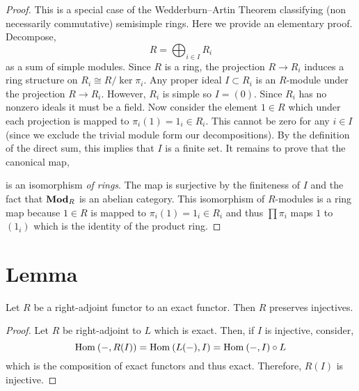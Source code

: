 \documentclass[12pt]{article}
\begin{document}
\begin{proof}
This is a special case of the Wedderburn–Artin Theorem classifying (non necessarily commutative) semisimple rings. Here we provide an elementary proof. Decompose,
\[ R = \bigoplus_{i \in I} R_i \]
as a sum of simple modules. Since $R$ is a ring, the projection $R \to R_i$ induces a ring structure on $R_i \cong R / \ker{\pi_i}$. Any proper ideal $I \subset R_i$ is an $R$-module under the projection $R \to R_i$. However, $R_i$ is simple so $I = (0)$. Since $R_i$ has no nonzero ideals it must be a field. Now consider the element $1 \in R$ which under each projection is mapped to $\pi_i(1) = 1_i \in R_i$. This cannot be zero for any $i \in I$ (since we exclude the trivial module form our decompositions). By the definition of the direct sum, this implies that $I$ is a finite set. It remains to prove that the canonical map,
\begin{center}
\end{center} 
is an isomorphism \textit{of rings}. The map is surjective by the finiteness of $I$ and the fact that $\mathbf{Mod}_{R}$ is an abelian category. This isomorphism of $R$-modules is a ring map because $1 \in R$ is mapped to $\pi_i(1) = 1_i \in R_i$ and thus $\prod \pi_i$ maps $1$ to $(1_i)$ which is the identity of the product ring.  
\end{proof}

\section{Lemma}

\begin{lemma} \label{right_adjoint_to_exact_preserves_injectives}
Let $R$ be a right-adjoint functor to an exact functor. Then $R$ preserves injectives.
\end{lemma}

\begin{proof}
Let $R$ be right-adjoint to $L$ which is exact. Then, if $I$ is injective, consider,
\[ \mathrm{Hom}_{} \left( -, R(I) \right) = \mathrm{Hom}_{} \left( L(-), I \right) = \mathrm{Hom}_{} \left( -, I \right) \circ L \]
which is the composition of exact functors and thus exact. Therefore, $R(I)$ is injective.
\end{proof}
\end{document}
